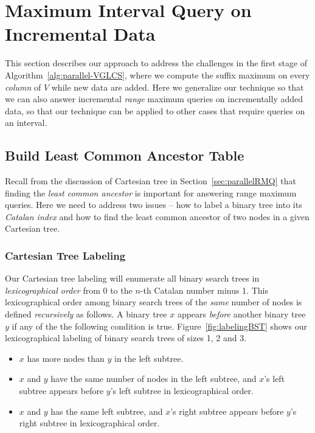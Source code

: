 \section{Maximum Interval Query on Incremental Data} \label{sec:QIUD}

This section describes our approach to address the challenges in the
first stage of Algorithm~\ref{alg:parallel-VGLCS}, where we compute
the suffix maximum on every {\em column} of $V$ while new data are
added.  Here we generalize our technique so that we can also answer
incremental {\em range} maximum queries on incrementally added data,
so that our technique can be applied to other cases that require
queries on an interval.

%

\subsection{Build Least Common Ancestor Table}

Recall from the discussion of Cartesian tree in
Section~\ref{sec:parallelRMQ} that finding the {\em least common
ancestor} is important for answering range maximum queries.  Here we
need to address two issues -- how to label a binary tree into its {\em
Catalan index} and how to find the least common ancestor of two nodes in
a given Cartesian tree.

\subsubsection{Cartesian Tree Labeling}

Our Cartesian tree labeling will enumerate all binary search trees in
{\em lexicographical order} from $0$ to the $n$-th Catalan number
minus 1.  This lexicographical order among binary search trees of the
{\em same} number of nodes is defined {\em recursively} as follows.  A
binary tree $x$ appears {\em before} another binary tree $y$ if any of
the the following condition is true.  Figure~\ref{fig:labelingBST}
shows our lexicographical labeling of binary search trees of sizes 1,
2 and 3.

\begin{itemize}
\item $x$ has more nodes than $y$ in the left subtree.
\item $x$ and $y$ have the same number of nodes in the left subtree,
  and $x$'s left subtree appears before $y$'s left subtree in
  lexicographical order.
\item $x$ and $y$ has the same left subtree, and $x$'s right subtree
  appears before $y$'s right subtree in lexicographical order.
\end{itemize}

